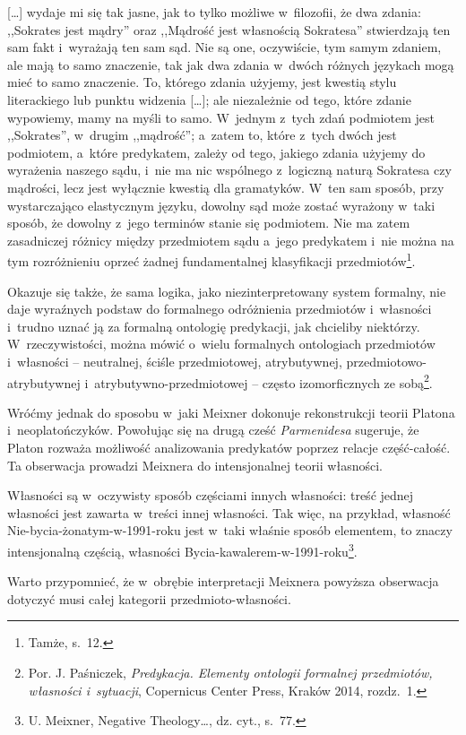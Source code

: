 […] wydaje mi się tak jasne, jak to tylko możliwe w~filozofii, że dwa zdania: ,,Sokrates jest mądry'' oraz ,,Mądrość jest własnością Sokratesa'' stwierdzają ten sam fakt i~wyrażają ten sam sąd. Nie są one, oczywiście, tym samym zdaniem, ale mają to samo znaczenie, tak jak dwa zdania w~dwóch różnych językach mogą mieć to samo znaczenie. To, którego zdania użyjemy, jest kwestią stylu literackiego lub punktu widzenia […]; ale niezależnie od tego, które zdanie wypowiemy, mamy na myśli to samo. W~jednym z~tych zdań podmiotem jest ,,Sokrates'', w~drugim ,,mądrość''; a~zatem to, które z~tych dwóch jest podmiotem, a~które predykatem, zależy od tego, jakiego zdania użyjemy do wyrażenia naszego sądu, i~nie ma nic wspólnego z~logiczną naturą Sokratesa czy mądrości, lecz jest wyłącznie kwestią dla gramatyków. W~ten sam sposób, przy wystarczająco elastycznym języku, dowolny sąd może zostać wyrażony w~taki sposób, że dowolny z~jego terminów stanie się podmiotem. Nie ma zatem zasadniczej różnicy między przedmiotem sądu a~jego predykatem i~nie można na tym rozróżnieniu oprzeć żadnej fundamentalnej klasyfikacji przedmiotów\footnote{ Tamże, s.~12.}.

Okazuje się także, że sama logika, jako niezinterpretowany system formalny, nie daje wyraźnych podstaw do formalnego odróżnienia przedmiotów i~własności i~trudno uznać ją za formalną ontologię predykacji, jak chcieliby niektórzy. W~rzeczywistości, można mówić o~wielu formalnych ontologiach przedmiotów i~własności -- neutralnej, ściśle przedmiotowej, atrybutywnej, przedmiotowo-atrybutywnej i~atrybutywno-przedmiotowej -- często izomorficznych ze sobą\footnote{ Por. J. Paśniczek, \textit{Predykacja. Elementy ontologii formalnej przedmiotów, własności i~sytuacji}, Copernicus Center Press, Kraków 2014, rozdz.~1.}.

Wróćmy jednak do sposobu w~jaki Meixner dokonuje rekonstrukcji teorii Platona i~neoplatończyków. Powołując się na drugą cześć \textit{Parmenidesa} sugeruje, że Platon rozważa możliwość analizowania predykatów poprzez relacje część-całość. Ta obserwacja prowadzi Meixnera do intensjonalnej teorii własności.

Własności są w~oczywisty sposób częściami innych własności: treść jednej własności jest zawarta w~treści innej własności. Tak więc, na przykład, własność Nie-bycia-żonatym-w-1991-roku jest w~taki właśnie sposób elementem, to znaczy intensjonalną częścią, własności Bycia-kawalerem-w-1991-roku\footnote{ U. Meixner, Negative Theology…, dz. cyt., s.~77.}.

Warto przypomnieć, że w~obrębie interpretacji Meixnera powyższa obserwacja dotyczyć musi całej kategorii przedmioto-własności.

